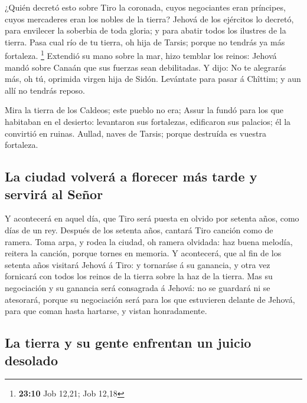  ¿Quién decretó esto sobre Tiro la coronada, cuyos
negociantes eran príncipes, cuyos mercaderes eran los nobles de la
tierra?  Jehová de los ejércitos lo decretó, para
envilecer la soberbia de toda gloria; y para abatir todos los ilustres
de la tierra.  Pasa cual río de tu tierra, oh hija de
Tarsis; porque no tendrás ya más fortaleza. \footnote{\textbf{23:10} Job
  12,21; Job 12,18}  Extendió su mano sobre la mar, hizo
temblar los reinos: Jehová mandó sobre Canaán que sus fuerzas sean
debilitadas.  Y dijo: No te alegrarás más, oh tú,
oprimida virgen hija de Sidón. Levántate para pasar á Chîttim; y aun
allí no tendrás reposo.

 Mira la tierra de los Caldeos; este pueblo no era; Assur
la fundó para los que habitaban en el desierto: levantaron sus
fortalezas, edificaron sus palacios; él la convirtió en ruinas.
 Aullad, naves de Tarsis; porque destruída es vuestra
fortaleza.

\hypertarget{la-ciudad-volveruxe1-a-florecer-muxe1s-tarde-y-serviruxe1-al-seuxf1or}{%
\subsection{La ciudad volverá a florecer más tarde y servirá al
Señor}\label{la-ciudad-volveruxe1-a-florecer-muxe1s-tarde-y-serviruxe1-al-seuxf1or}}

 Y acontecerá en aquel día, que Tiro será puesta en
olvido por setenta años, como días de un rey. Después de los setenta
años, cantará Tiro canción como de ramera.  Toma arpa, y
rodea la ciudad, oh ramera olvidada: haz buena melodía, reitera la
canción, porque tornes en memoria.  Y acontecerá, que al
fin de los setenta años visitará Jehová á Tiro: y tornaráse á su
ganancia, y otra vez fornicará con todos los reinos de la tierra sobre
la haz de la tierra.  Mas su negociación y su ganancia
será consagrada á Jehová: no se guardará ni se atesorará, porque su
negociación será para los que estuvieren delante de Jehová, para que
coman hasta hartarse, y vistan honradamente.

\hypertarget{la-tierra-y-su-gente-enfrentan-un-juicio-desolado}{%
\subsection{La tierra y su gente enfrentan un juicio
desolado}\label{la-tierra-y-su-gente-enfrentan-un-juicio-desolado}}

